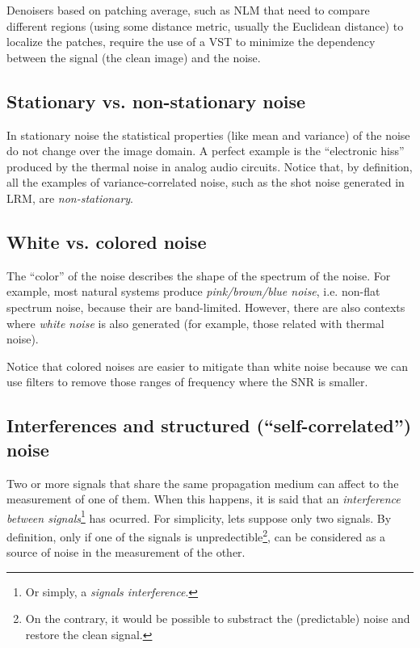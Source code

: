Denoisers based on patching average, such as \gls{NLM} that need to
compare different regions (using some distance metric, usually the
Euclidean distance) to localize the patches, require the use of a
\gls{VST} to minimize the dependency between the signal (the clean
image) and the noise.


\subsection{Stationary vs. non-stationary noise}

In stationary noise the statistical properties (like mean and
variance) of the noise do not change over the image domain. A perfect
example is the ``electronic hiss'' produced by the thermal noise in
analog audio circuits. Notice that, by definition, all the examples of
variance-correlated noise, such as the shot noise generated in
\gls{LRM}, are \emph{non-stationary}.


\subsection{White vs. colored noise}

The ``color'' of the noise describes the shape of the spectrum of the
noise. For example, most natural systems produce \emph{pink/brown/blue
  noise}, i.e. non-flat spectrum noise, because their are
band-limited. However, there are also contexts where \emph{white
  noise} is also generated (for example, those related with thermal
noise).

Notice that colored noises are easier to mitigate than white noise
because we can use filters to remove those ranges of frequency where
the \gls{SNR} is smaller.


\subsection{Interferences and structured  (``self-correlated'') noise}

Two or more signals that share the same propagation medium can affect
to the measurement of one of them. When this happens, it is said that
an \emph{interference between signals}\footnote{Or simply, a
\emph{signals interference}.} has ocurred. For simplicity, lets
suppose only two signals. By definition, only if one of the signals is
unpredectible\footnote{On the contrary, it would be possible to
substract the (predictable) noise and restore the clean signal.}, can
be considered as a source of noise in the measurement of the other.

